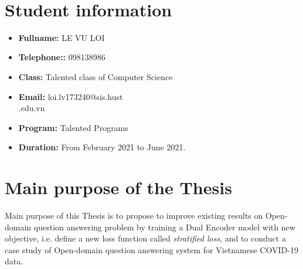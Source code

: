\documentclass[12pt, sort&compress]{report}
\begin{document}
\begin{center}
	\\
\end{center}
\section*{Student information}

\begin{multicols}{2}
	\begin{itemize}
		\item \textbf{Fullname:} LE VU LOI
		\item \textbf{Telephone::} 098138986
		\item \textbf{Class:} Talented class of Computer Science
		\item \textbf{Email:} loi.lv173240@sis.hust\\.edu.vn
		\item \textbf{Program:} Talented Programs
	\end{itemize}
\end{multicols}
\begin{itemize}
	\item \textbf{Duration:} From February 2021 to June 2021.
\end{itemize}
\section*{Main purpose of the Thesis}
Main purpose of this Thesis is to propose to improve existing results on Open-domain question answering problem by training a Dual Encoder model with new objective, i.e. define a new loss function called \textit{stratified loss}, and to conduct a case study of Open-domain question answering system for Vietnamese COVID-19 data. 
\end{document}
